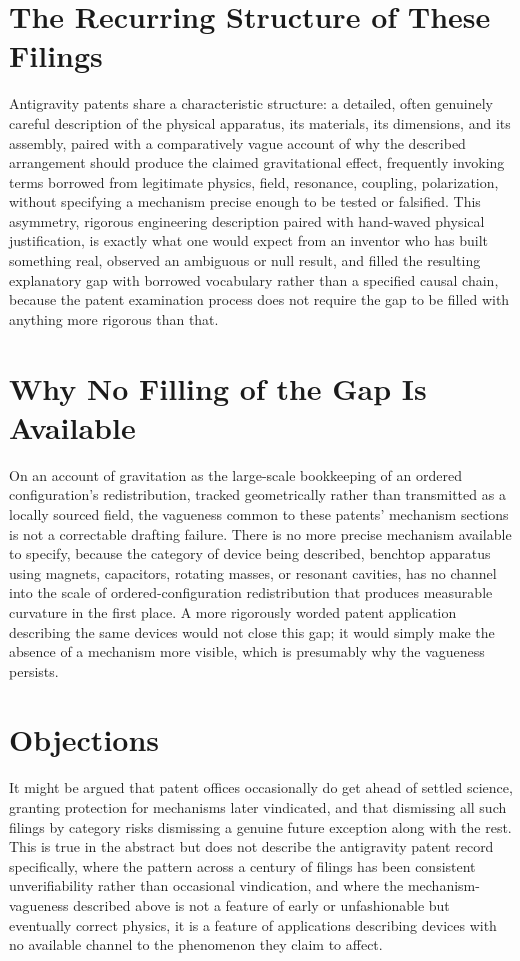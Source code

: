 \documentclass[11pt]{article}
\begin{document}
\section{The Recurring Structure of These Filings}

Antigravity patents share a characteristic structure: a detailed, often genuinely careful description of the physical apparatus, its materials, its dimensions, and its assembly, paired with a comparatively vague account of why the described arrangement should produce the claimed gravitational effect, frequently invoking terms borrowed from legitimate physics, field, resonance, coupling, polarization, without specifying a mechanism precise enough to be tested or falsified. This asymmetry, rigorous engineering description paired with hand-waved physical justification, is exactly what one would expect from an inventor who has built something real, observed an ambiguous or null result, and filled the resulting explanatory gap with borrowed vocabulary rather than a specified causal chain, because the patent examination process does not require the gap to be filled with anything more rigorous than that.

\section{Why No Filling of the Gap Is Available}

On an account of gravitation as the large-scale bookkeeping of an ordered configuration's redistribution, tracked geometrically rather than transmitted as a locally sourced field, the vagueness common to these patents' mechanism sections is not a correctable drafting failure. There is no more precise mechanism available to specify, because the category of device being described, benchtop apparatus using magnets, capacitors, rotating masses, or resonant cavities, has no channel into the scale of ordered-configuration redistribution that produces measurable curvature in the first place. A more rigorously worded patent application describing the same devices would not close this gap; it would simply make the absence of a mechanism more visible, which is presumably why the vagueness persists.

\section{Objections}

It might be argued that patent offices occasionally do get ahead of settled science, granting protection for mechanisms later vindicated, and that dismissing all such filings by category risks dismissing a genuine future exception along with the rest. This is true in the abstract but does not describe the antigravity patent record specifically, where the pattern across a century of filings has been consistent unverifiability rather than occasional vindication, and where the mechanism-vagueness described above is not a feature of early or unfashionable but eventually correct physics, it is a feature of applications describing devices with no available channel to the phenomenon they claim to affect.
\end{document}
